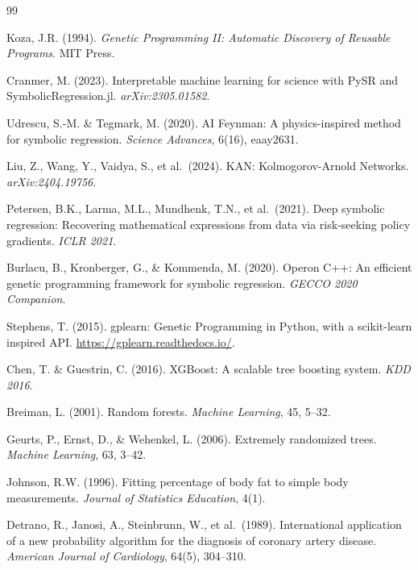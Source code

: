 \documentclass[10pt,twocolumn]{article}
\begin{document}
\begin{thebibliography}{99}

Koza, J.R. (1994).
\textit{Genetic Programming II: Automatic Discovery of Reusable Programs}.
MIT Press.

Cranmer, M. (2023).
Interpretable machine learning for science with PySR and SymbolicRegression.jl.
\textit{arXiv:2305.01582}.

Udrescu, S.-M. \& Tegmark, M. (2020).
AI Feynman: A physics-inspired method for symbolic regression.
\textit{Science Advances}, 6(16), eaay2631.

Liu, Z., Wang, Y., Vaidya, S., et al.\ (2024).
KAN: Kolmogorov-Arnold Networks.
\textit{arXiv:2404.19756}.

Petersen, B.K., Larma, M.L., Mundhenk, T.N., et al.\ (2021).
Deep symbolic regression: Recovering mathematical expressions from data via
risk-seeking policy gradients.
\textit{ICLR 2021}.

Burlacu, B., Kronberger, G., \& Kommenda, M. (2020).
Operon C++: An efficient genetic programming framework for symbolic regression.
\textit{GECCO 2020 Companion}.

Stephens, T. (2015).
gplearn: Genetic Programming in Python, with a scikit-learn inspired API.
\url{https://gplearn.readthedocs.io/}.

Chen, T. \& Guestrin, C. (2016).
XGBoost: A scalable tree boosting system.
\textit{KDD 2016}.

Breiman, L. (2001).
Random forests.
\textit{Machine Learning}, 45, 5--32.

Geurts, P., Ernst, D., \& Wehenkel, L. (2006).
Extremely randomized trees.
\textit{Machine Learning}, 63, 3--42.

Johnson, R.W. (1996).
Fitting percentage of body fat to simple body measurements.
\textit{Journal of Statistics Education}, 4(1).

Detrano, R., Janosi, A., Steinbrunn, W., et al.\ (1989).
International application of a new probability algorithm for the diagnosis of
coronary artery disease.
\textit{American Journal of Cardiology}, 64(5), 304--310.


\end{thebibliography}
\end{document}
